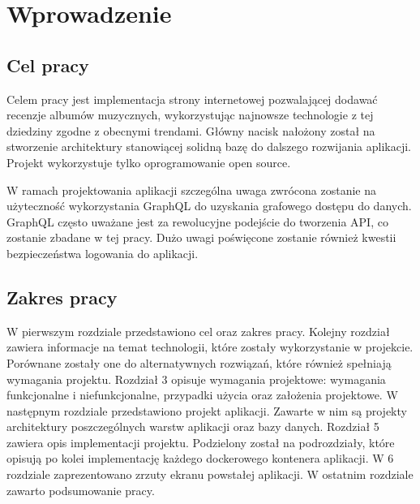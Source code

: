 \chapter{Wprowadzenie}
\label{sec:wprowadzenie}

\section{Cel pracy}
	Celem pracy jest implementacja strony internetowej pozwalającej dodawać recenzje albumów muzycznych,
	wykorzystując najnowsze technologie z tej dziedziny zgodne z obecnymi trendami.
	Główny nacisk nałożony został na stworzenie architektury stanowiącej solidną bazę do dalszego rozwijania aplikacji.
	Projekt wykorzystuje tylko oprogramowanie open source.

	W ramach projektowania aplikacji szczególna uwaga zwrócona zostanie na użyteczność wykorzystania GraphQL do uzyskania grafowego dostępu do danych.
	GraphQL często uważane jest za rewolucyjne podejście do tworzenia API, co zostanie zbadane w tej pracy.
	Dużo uwagi poświęcone zostanie również kwestii bezpieczeństwa logowania do aplikacji.

\section{Zakres pracy}
	W pierwszym rozdziale przedstawiono cel oraz zakres pracy.
	Kolejny rozdział zawiera informacje na temat technologii, które zostały wykorzystanie w projekcie.
	Porównane zostały one do alternatywnych rozwiązań, które również spełniają wymagania projektu.
	Rozdział 3 opisuje wymagania projektowe: wymagania funkcjonalne i niefunkcjonalne, przypadki użycia oraz założenia projektowe.
	W następnym rozdziale przedstawiono projekt aplikacji.
	Zawarte w nim są projekty architektury poszczególnych warstw aplikacji oraz bazy danych.
	Rozdział 5 zawiera opis implementacji projektu.
	Podzielony został na podrozdziały, które opisują po kolei implementację każdego dockerowego kontenera aplikacji.
	W 6 rozdziale zaprezentowano zrzuty ekranu powstałej aplikacji.
	W ostatnim rozdziale zawarto podsumowanie pracy.
